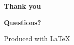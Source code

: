 \begin{frame}[fragile,t]
\vfill\vfill
\begin{center}
{\bf \Huge \color{white} Thank you}
\end{center}
\begin{center}
{\bf \Huge \color{white} Questions?}
\end{center}
\vfill\vfill
{\color{lightgray} \small Produced with \LaTeX}
\end{frame}
